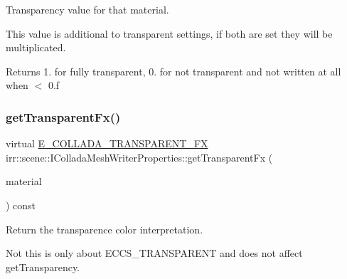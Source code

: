 Transparency value for that material. 

This value is additional to transparent settings, if both are set they will be multiplicated. \begin{DoxyReturn}{Returns}
1. for fully transparent, 0. for not transparent and not written at all when $<$ 0.\+f 
\end{DoxyReturn}
\mbox{\label{classirr_1_1scene_1_1IColladaMeshWriterProperties_a0d934ae86d3e587ae22f74d775bbfa36}} 
\subsubsection{\texorpdfstring{get\+Transparent\+Fx()}{getTransparentFx()}\hspace{0.1cm}{\footnotesize\ttfamily [1/2]}}
{\footnotesize\ttfamily virtual \hyperlink{namespaceirr_1_1scene_af7dadd5b96b683cfe1800f343c4f6619}{E\+\_\+\+C\+O\+L\+L\+A\+D\+A\+\_\+\+T\+R\+A\+N\+S\+P\+A\+R\+E\+N\+T\+\_\+\+FX} irr\+::scene\+::\+I\+Collada\+Mesh\+Writer\+Properties\+::get\+Transparent\+Fx (\begin{DoxyParamCaption}\item[{const \hyperlink{classirr_1_1video_1_1SMaterial}{video\+::\+S\+Material} \&}]{material }\end{DoxyParamCaption}) const\hspace{0.3cm}{\ttfamily [pure virtual]}}



Return the transparence color interpretation. 

Not this is only about E\+C\+C\+S\+\_\+\+T\+R\+A\+N\+S\+P\+A\+R\+E\+NT and does not affect get\+Transparency. \mbox{\label{classirr_1_1scene_1_1IColladaMeshWriterProperties_a0d934ae86d3e587ae22f74d775bbfa36}} 
